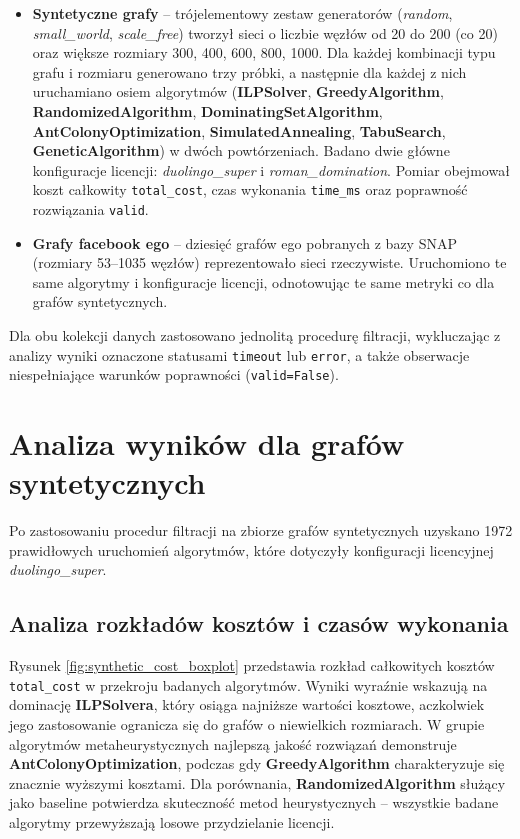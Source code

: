 \begin{itemize}
\item \textbf{Syntetyczne grafy} -- trójelementowy zestaw generatorów (\emph{random}, \emph{small\_world}, \emph{scale\_free}) tworzył sieci o liczbie węzłów od 20 do 200 (co 20) oraz większe rozmiary 300, 400, 600, 800, 1000. Dla każdej kombinacji typu grafu i rozmiaru generowano trzy próbki, a następnie dla każdej z nich uruchamiano osiem algorytmów (\textbf{ILPSolver}, \textbf{GreedyAlgorithm}, \textbf{RandomizedAlgorithm}, \textbf{DominatingSetAlgorithm}, \textbf{AntColonyOptimization}, \textbf{SimulatedAnnealing}, \textbf{TabuSearch}, \textbf{GeneticAlgorithm}) w dwóch powtórzeniach. Badano dwie główne konfiguracje licencji: \emph{duolingo\_super} i \emph{roman\_domination}. Pomiar obejmował koszt całkowity \texttt{total\_cost}, czas wykonania \texttt{time\_ms} oraz poprawność rozwiązania \texttt{valid}.

\item \textbf{Grafy facebook ego} -- dziesięć grafów ego pobranych z bazy SNAP (rozmiary 53--1035 węzłów) reprezentowało sieci rzeczywiste. Uruchomiono te same algorytmy i konfiguracje licencji, odnotowując te same metryki co dla grafów syntetycznych.
\end{itemize}

Dla obu kolekcji danych zastosowano jednolitą procedurę filtracji, wykluczając z analizy wyniki oznaczone statusami \texttt{timeout} lub \texttt{error}, a także obserwacje niespełniające warunków poprawności (\texttt{valid=False}).

\section{Analiza wyników dla grafów syntetycznych}

Po zastosowaniu procedur filtracji na zbiorze grafów syntetycznych uzyskano 1972 prawidłowych uruchomień algorytmów, które dotyczyły konfiguracji licencyjnej \emph{duolingo\_super}.

\subsection{Analiza rozkładów kosztów i czasów wykonania}

Rysunek \ref{fig:synthetic_cost_boxplot} przedstawia rozkład całkowitych kosztów \texttt{total\_cost} w przekroju badanych algorytmów. Wyniki wyraźnie wskazują na dominację \textbf{ILPSolvera}, który osiąga najniższe wartości kosztowe, aczkolwiek jego zastosowanie ogranicza się do grafów o niewielkich rozmiarach. W grupie algorytmów metaheurystycznych najlepszą jakość rozwiązań demonstruje \textbf{AntColonyOptimization}, podczas gdy \textbf{GreedyAlgorithm} charakteryzuje się znacznie wyższymi kosztami. Dla porównania, \textbf{RandomizedAlgorithm} służący jako baseline potwierdza skuteczność metod heurystycznych -- wszystkie badane algorytmy przewyższają losowe przydzielanie licencji.


